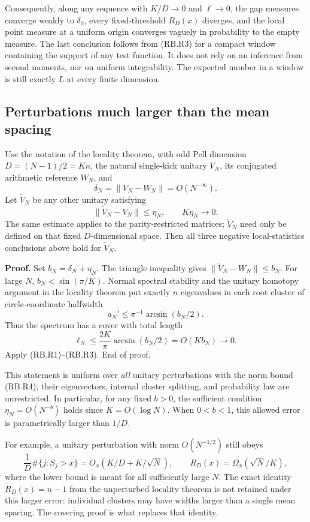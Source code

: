 Consequently, along any sequence with \(K/D\to0\) and \(\ell\to0\), the gap measures converge weakly to \(\delta_0\), every fixed-threshold \(R_D(x)\) diverges, and the local point measure at a uniform origin converges vaguely in probability to the empty measure. The last conclusion follows from (RB.R3) for a compact window containing the support of any test function. It does not rely on an inference from second moments, nor on uniform integrability. The expected number in a window is still exactly \(L\) at every finite dimension.

\subsection{Perturbations much larger than the mean spacing}\label{robustness:perturbations-much-larger-than-the-mean-spacing}

Use the notation of the locality theorem, with odd Pell dimension \(D=(N-1)/2=Kn\), the natural single-kick unitary \(V_N\), its conjugated arithmetic reference \(W_N\), and \[
 \delta_N=\|V_N-W_N\|=O(N^{-\infty}).
\] Let \(\widetilde V_N\) be any other unitary satisfying \[
 \|\widetilde V_N-V_N\|\leq\eta_N,\qquad K\eta_N\to0.       \tag{RB.R4}
\] The same estimate applies to the parity-restricted matrices; \(\widetilde V_N\) need only be defined on that fixed \(D\)-dimensional space. Then all three negative local-statistics conclusions above hold for \(\widetilde V_N\).

\textbf{Proof.} Set \(b_N=\delta_N+\eta_N\). The triangle inequality gives \(\|\widetilde V_N-W_N\|\leq b_N\). For large \(N\), \(b_N<\sin(\pi/K)\). Normal spectral stability and the unitary homotopy argument in the locality theorem put exactly \(n\) eigenvalues in each root cluster of circle-coordinate halfwidth \[
 a_N'\leq\pi^{-1}\arcsin(b_N/2).
\] Thus the spectrum has a cover with total length \[
 \ell_N\leq\frac{2K}{\pi}\arcsin(b_N/2)=O(Kb_N)\to0.       \tag{RB.R5}
\] Apply (RB.R1)--(RB.R3). End of proof.

This statement is uniform over \emph{all} unitary perturbations with the norm bound (RB.R4); their eigenvectors, internal cluster splitting, and probability law are unrestricted. In particular, for any fixed \(b>0\), the sufficient condition \(\eta_N=O(N^{-b})\) holds since \(K=O(\log N)\). When \(0<b<1\), this allowed error is parametrically larger than \(1/D\).

For example, a unitary perturbation with norm \(O(N^{-1/2})\) still obeys \[
 \frac1D\#\{j:S_j>x\}=O_x(K/D+K/\sqrt N),\qquad
 R_D(x)=\Omega_x(\sqrt N/K),                                \tag{RB.R6}
\] where the lower bound is meant for all sufficiently large \(N\). The exact identity \(R_D(x)=n-1\) from the unperturbed locality theorem is not retained under this larger error: individual clusters may have widths larger than a single mean spacing. The covering proof is what replaces that identity.

